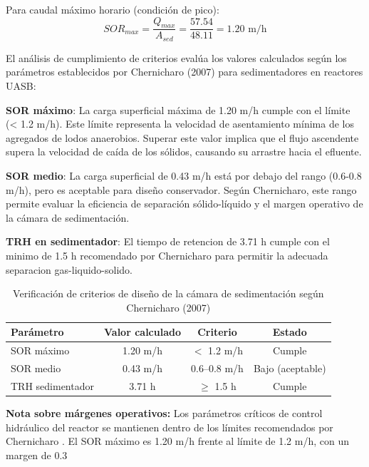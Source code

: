 \documentclass[12pt,a4paper]{article}
\begin{document}
Para caudal máximo horario (condición de pico):
\begin{equation}
SOR_{max} = \frac{Q_{max}}{A_{sed}} = \frac{57.54}{48.11} = 1.20 \text{ m/h}
\end{equation}

El análisis de cumplimiento de criterios evalúa los valores calculados según los parámetros establecidos por Chernicharo (2007) para sedimentadores en reactores UASB:


     \textbf{SOR máximo}: La carga superficial máxima de 1.20 m/h cumple con el límite (< 1.2 m/h). Este límite representa la velocidad de asentamiento mínima de los agregados de lodos anaerobios. Superar este valor implica que el flujo ascendente supera la velocidad de caída de los sólidos, causando su arrastre hacia el efluente.
    
     \textbf{SOR medio}: La carga superficial de 0.43 m/h está por debajo del rango (0.6-0.8 m/h), pero es aceptable para diseño conservador. Según Chernicharo, este rango permite evaluar la eficiencia de separación sólido-líquido y el margen operativo de la cámara de sedimentación.
    
     \textbf{TRH en sedimentador}: El tiempo de retencion de 3.71 h cumple con el minimo de 1.5 h recomendado por Chernicharo para permitir la adecuada separacion gas-liquido-solido.


\begin{table}[H]
\centering
\caption{Verificación de criterios de diseño de la cámara de sedimentación según Chernicharo (2007)}
\begin{tabular}{lccc}
\toprule
\textbf{Parámetro} & \textbf{Valor calculado} & \textbf{Criterio} & \textbf{Estado} \\
\midrule
SOR máximo & 1.20 m/h & $<$ 1.2 m/h & Cumple \\
SOR medio & 0.43 m/h & 0.6--0.8 m/h & Bajo (aceptable) \\
TRH sedimentador & 3.71 h & $\geq$ 1.5 h & Cumple \\
\bottomrule
\end{tabular}
\end{table}

\textbf{Nota sobre márgenes operativos:} Los parámetros críticos de control hidráulico del reactor se mantienen dentro de los límites recomendados por Chernicharo \cite{chernicharo2007}. El SOR máximo es 1.20 m/h frente al límite de 1.2 m/h, con un margen de 0.3%
\end{document}
